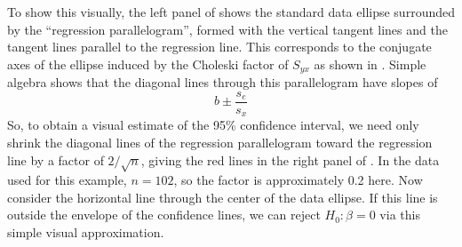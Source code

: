 To show this visually, the left panel of  shows the standard data ellipse
surrounded by the ``regression parallelogram'', formed with the vertical tangent lines and the
tangent lines parallel to the regression line. This corresponds to the conjugate axes of the
ellipse induced by the Choleski factor of $S_{yx}$ as shown in .
Simple algebra shows that the diagonal lines through
this parallelogram have slopes of
\begin{equation*}
 b \pm \frac{s_{e}}{s_x}
\end{equation*}
So, to obtain a visual estimate of the 95\% confidence interval, we need only shrink the diagonal lines of the
regression parallelogram toward the regression line by a factor of $2/\sqrt{n}$, giving the red lines
in the right panel of .  
In the data used for this
example, $n=102$, so the factor  is approximately 0.2 here.
Now consider the horizontal line through the center of the data ellipse.  If this line is outside the 
envelope of the confidence lines, we can reject $H_0 : \beta = 0$ via this simple visual approximation.
